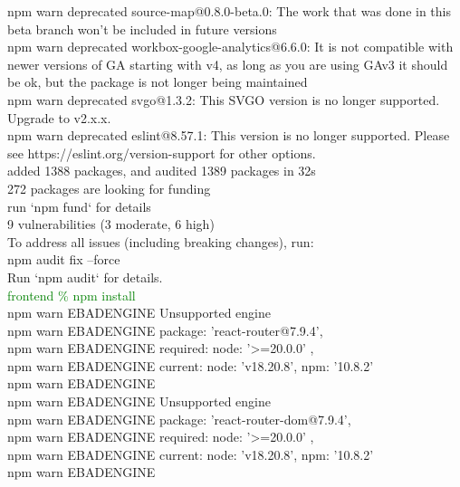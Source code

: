\documentclass[12pt, a4paper]{article}
\begin{document}
\begin{monoblock}
            npm warn deprecated source-map@0.8.0-beta.0: The work that was done in this beta branch won't be included in future versions \\
            npm warn deprecated workbox-google-analytics@6.6.0: It is not compatible with newer versions of GA starting with v4, as long as you are using GAv3 it should be ok, but the package is not longer being maintained \\
            npm warn deprecated svgo@1.3.2: This SVGO version is no longer supported. Upgrade to v2.x.x. \\
            npm warn deprecated eslint@8.57.1: This version is no longer supported. Please see https://eslint.org/version-support for other options. \\
            
            added 1388 packages, and audited 1389 packages in 32s \\
            
            272 packages are looking for funding \\
              run `npm fund` for details \\
            
            9 vulnerabilities (3 moderate, 6 high) \\
            
            To address all issues (including breaking changes), run: \\
              npm audit fix --force \\
            
            Run `npm audit` for details. \\
        
            \textcolor{green}{frontend \% npm install} \\
            
            npm warn EBADENGINE Unsupported engine { \\
            npm warn EBADENGINE   package: 'react-router@7.9.4', \\
            npm warn EBADENGINE   required: { node: '>=20.0.0' }, \\
            npm warn EBADENGINE   current: { node: 'v18.20.8', npm: '10.8.2' } \\
            npm warn EBADENGINE } \\
            npm warn EBADENGINE Unsupported engine { \\
            npm warn EBADENGINE   package: 'react-router-dom@7.9.4', \\
            npm warn EBADENGINE   required: { node: '>=20.0.0' }, \\
            npm warn EBADENGINE   current: { node: 'v18.20.8', npm: '10.8.2' } \\
            npm warn EBADENGINE } \\
            

\end{monoblock}
\end{document}
